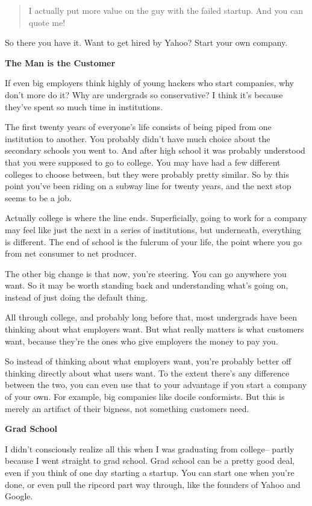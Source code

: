 \documentclass[12pt]{book}
\begin{document}
\begin{quote}
I actually put more value on the guy with the failed startup. And you
can quote me!
\end{quote}

So there you have it. Want to get hired by Yahoo? Start your own
company.

\textbf{The Man is the Customer}

If even big employers think highly of young hackers who start companies,
why don't more do it? Why are undergrads so conservative? I think it's
because they've spent so much time in institutions.

The first twenty years of everyone's life consists of being piped from
one institution to another. You probably didn't have much choice about
the secondary schools you went to. And after high school it was probably
understood that you were supposed to go to college. You may have had a
few different colleges to choose between, but they were probably pretty
similar. So by this point you've been riding on a subway line for twenty
years, and the next stop seems to be a job.

Actually college is where the line ends. Superficially, going to work
for a company may feel like just the next in a series of institutions,
but underneath, everything is different. The end of school is the
fulcrum of your life, the point where you go from net consumer to net
producer.

The other big change is that now, you're steering. You can go anywhere
you want. So it may be worth standing back and understanding what's
going on, instead of just doing the default thing.

All through college, and probably long before that, most undergrads have
been thinking about what employers want. But what really matters is what
customers want, because they're the ones who give employers the money to
pay you.

So instead of thinking about what employers want, you're probably better
off thinking directly about what users want. To the extent there's any
difference between the two, you can even use that to your advantage if
you start a company of your own. For example, big companies like docile
conformists. But this is merely an artifact of their bigness, not
something customers need.

\textbf{Grad School}

I didn't consciously realize all this when I was graduating from
college-- partly because I went straight to grad school. Grad school can
be a pretty good deal, even if you think of one day starting a startup.
You can start one when you're done, or even pull the ripcord part way
through, like the founders of Yahoo and Google.
\end{document}

